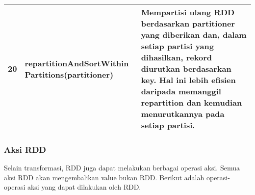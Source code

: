 \begin{tabular}{|p{}|p{}|p{}|}
\hline
20 & repartitionAndSortWithin Partitions(partitioner) & Mempartisi ulang RDD berdasarkan partitioner yang diberikan dan, dalam setiap partisi yang dihasilkan, rekord diurutkan berdasarkan key. Hal ini lebih efisien daripada memanggil repartition dan kemudian menurutkannya pada setiap partisi. \\ 
\hline
\end{tabular} 

\subsubsection{Aksi RDD}
Selain transformasi, RDD juga dapat melakukan berbagai operasi aksi. Semua aksi RDD akan mengembalikan value bukan RDD. Berikut adalah operasi-operasi aksi yang dapat dilakukan oleh RDD.\\\\
